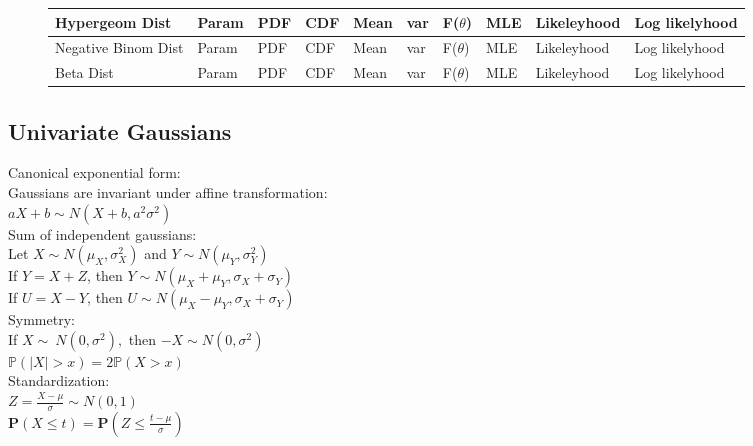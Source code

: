 \begin{figure*}
{\begin{tabular}{ l  l  l  l l  l  l l  l l}
  
 Hypergeom  Dist 
 & Param & PDF & CDF & Mean & var & F($\theta$) & MLE & Likeleyhood & Log likelyhood  \\\hline 
 
 
 Negative Binom  Dist  & Param & PDF & CDF & Mean & var & F($\theta$) & MLE & Likeleyhood & Log likelyhood  \\\hline 
 
 Beta  Dist  & Param & PDF & CDF & Mean & var & F($\theta$) & MLE & Likeleyhood & Log likelyhood  \\\hline 
 
 
\end{tabular}
} %

\end{figure*}


\subsection*{Univariate Gaussians}

Canonical exponential form:\\

Gaussians are invariant under affine transformation:\\

$aX+b \sim N(X+b,a^2\sigma^2)$\\

Sum of independent gaussians:\\

Let $X {\sim} N(\mu_X,\sigma_X^2)$ and $Y {\sim} N(\mu_Y,\sigma_Y^2)$\\

If $Y = X + Z$, then $Y \sim N(\mu_X + \mu_Y, \sigma_X + \sigma_Y)$\\

If $U = X - Y$, then $U \sim N(\mu_X - \mu_Y,\sigma_X + \sigma_Y)$\\

Symmetry:\\

If $X \sim\ N(0,\sigma^2),$ then $-X \sim N(0,\sigma^2)$\\

$\mathbb{P}(|X|>x) = 2\mathbb{P}(X>x)$\\

Standardization:\\

$Z= \frac{X-\mu}{\sigma} \sim N(0,1)$\\

$\mathbf{P}\left(X\leq t\right) = \displaystyle \mathbf{P}\left(Z\leq \frac{t-\mu}{\sigma}\right)$

